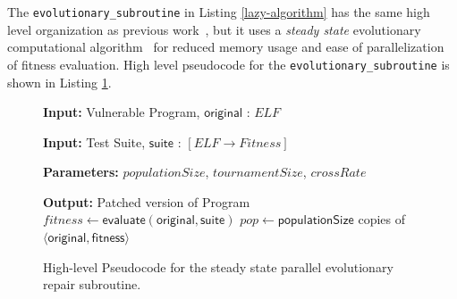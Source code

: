 \documentclass{sigcomm-alternate}
\begin{document}
The \texttt{evolutionary\_subroutine} in Listing \ref{lazy-algorithm} has
the same high level organization as previous work~\cite{FIXME},
but it uses a \emph{steady state}
evolutionary computational algorithm~\cite{Luke2013Metaheuristics} for
reduced memory usage and ease of parallelization of fitness evaluation.
High level pseudocode for the \texttt{evolutionary\_subroutine} is shown in
Listing \ref{evolutionary-subroutine}.

\begin{figure}[H]
\begin{algorithmic}[1]
\small
\item[{\textbf{Input: }} {Vulnerable Program, $\mathsf{original}$ : $ELF$}]
\item[{\textbf{Input: }} {Test Suite, $\mathsf{suite}$ : $[ELF \rightarrow Fitness]$}]
\item[{\textbf{Parameters: }} {$populationSize$, $tournamentSize$, $crossRate$}]
\item[{\textbf{Output: }} {Patched version of Program}] 
   $fitness \leftarrow \mathsf{evaluate}(\mathsf{original}, \mathsf{suite})$ 
   $pop \leftarrow \mathsf{populationSize}$ copies of $\langle \mathsf{original}, \mathsf{fitness} \rangle$
\end{algorithmic}
\caption{\label{evolutionary-subroutine}High-level Pseudocode for the
steady state parallel evolutionary repair subroutine.}
\end{figure}
\end{document}
